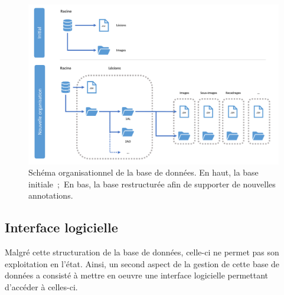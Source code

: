 \begin{figure}[H]
    \centering
    \includegraphics[width=0.9\linewidth]{contents/chapter_4/resources/scheme_data_structure.pdf}
    \caption{Schéma organisationnel de la base de données. En haut, la base initiale~;~En bas, la base restructurée afin de supporter de nouvelles annotations.}
    \label{fig:db_structure}
\end{figure}\par
\clearpage

\subsection{Interface logicielle}
\label{sec:dataset_api}
Malgré cette structuration de la base de données, celle-ci ne permet pas son exploitation en l'état. Ainsi, un second aspect de la gestion de cette base de données a consisté à mettre en oeuvre une interface logicielle permettant d'accéder à celles-ci.\par


